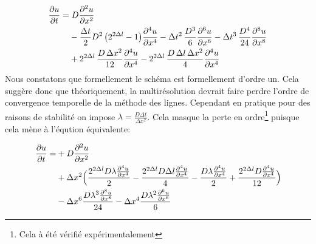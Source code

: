 \begin{align}
    \frac{\partial u}{\partial t} =&\; D \frac{\partial^2 u}{\partial x^2} \\\notag
    &- \frac{\Delta t}{2} D^2\, \bigl( 2^{2\Delta l}- 1 \bigr)          \frac{\partial^4 u}{\partial x^4}
    - \Delta t^2\, \frac{D^3}{6}          \frac{\partial^6 u}{\partial x^6}
    - \Delta t^3\, \frac{D^4}{24}         \frac{\partial^8 u}{\partial x^8} \\\notag
    &+ 2^{2\Delta l}\, \frac{D\, \Delta x^2}{12}    \frac{\partial^4 u}{\partial x^4}
    - 2^{2\Delta l}\, \frac{D\, \Delta l\, \Delta x^2}{4} \frac{\partial^4 u}{\partial x^4}
\end{align}
Nous constatons que formellement le schéma est formellement d'ordre un.
Cela suggère donc que théoriquement, la multirésolution devrait faire perdre l'ordre de convergence temporelle de la méthode des lignes.
Cependant en pratique pour des raisons de stabilité on impose $\lambda= \frac{D \Delta t } {\Delta x^2}$.
Cela masque la perte en ordre\footnote{Cela à été vérifié expérimentalement} puisque cela mène à l'éqution équivalente:

\begin{align}
    \frac{\partial u}{\partial t}
    =&+ D \frac{\partial^{2}u}{\partial x^{2}}\\\notag
     &+ \Delta x^{2}\Bigl(\frac{2^{2 \Delta l} D  \lambda \frac{\partial^{4}u}{\partial x^{4}}}{2} 
     -  \frac{2^{2 \Delta l} D \Delta l \frac{\partial^{4}u}{\partial x^{4}}}{4} 
     -  \frac{D \lambda \frac{\partial^{4}u}{\partial x^{4}}}{2} 
     +  \frac{2^{2 \Delta l} D\frac{\partial^{4}u}{\partial x^{4}}}{12}\Bigr)\\\notag
     &- \Delta x^{6} \frac{D \lambda^{3} \frac{\partial^{8}u}{\partial x^{8}}}{24} 
     - \Delta x^{4} \frac{D \lambda^{2} \frac{\partial^{6}u}{\partial x^{6}}}{6} 
\end{align}